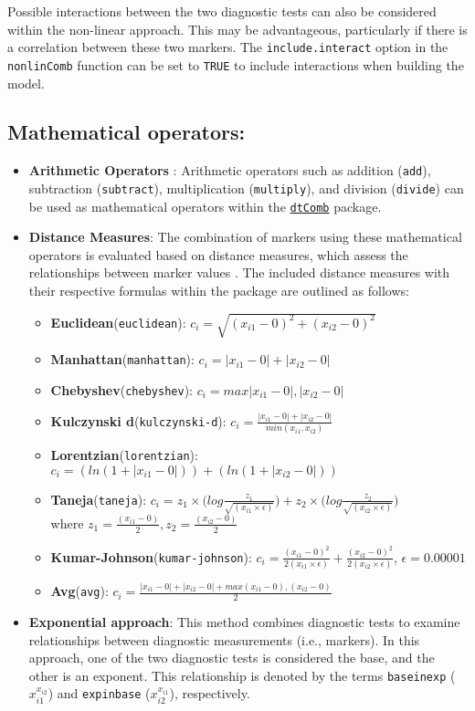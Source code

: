 \documentclass[10pt]{article}
\newcommand{\CRANpkg}[1]{\href{https://cran.r-project.org/web/packages/#1/index.html}{\texttt{#1}}}
\newcommand{\Rfunction}[1]{\texttt{#1}}
\begin{document}
Possible interactions between the two diagnostic tests can also be considered within the non-linear approach. This may be advantageous, particularly if there is a correlation between these two markers.  The \texttt{include.interact} option in the \Rfunction{nonlinComb} function can be set to \texttt{TRUE} to include interactions when building the model.
\subsection{Mathematical operators:}
\begin{itemize}
  \item \textbf{Arithmetic Operators} : Arithmetic operators such as addition (\texttt{add}), subtraction (\texttt{subtract}), multiplication (\texttt{multiply}), and division (\texttt{divide}) can be used as mathematical operators within the \CRANpkg{dtComb} package.
  \item \textbf{Distance Measures}: The combination of markers using these mathematical operators is evaluated based on distance measures, which assess the relationships between marker values \citep{cha2007comprehensive,pandit2011comparative, minaev2018distance}. The included distance measures with their respective formulas within the package are outlined as follows:
    \begin{itemize}
      \item \textbf{Euclidean}(\texttt{euclidean}): $c_i= { \sqrt{(x_{i1}-0)^2+(x_{i2}-0)^2}}$
      \item \textbf{Manhattan}(\texttt{manhattan}): $c_i = |x_{i1}-0|+|x_{i2}-0|$
      \item \textbf{Chebyshev}(\texttt{chebyshev}): $c_i = max{|x_{i1}-0|,|x_{i2}-0|}$
      \item \textbf{Kulczynski d}(\texttt{kulczynski-d}): $c_i = \frac{|x_{i1}-0|+|x_{i2}-0|}{min(x_{i1},x_{i2})}$ 
      \item \textbf{Lorentzian}(\texttt{lorentzian}): $c_i = (ln(1+|x_{i1}-0|))+ (ln(1+|x_{i2}-0|))$
      \item \textbf{Taneja}(\texttt{taneja}): $c_i = z_1\times\Biggl(log\frac{z_1}{\sqrt{(x_{i1}\times\epsilon )}}\Biggl)+z_2\times\Biggl(log\frac{z_2}{\sqrt{(x_{i2}\times\epsilon)}}\Biggl)$\\
      where $z_1 = \frac{(x_{i1}-0)}{2}, z_2 = \frac{(x_{i2}-0)}{2}$
            \item \textbf{Kumar-Johnson}(\texttt{kumar-johnson}): $c_i = {\frac{(x_{i1}-0)^2}{2(x_{i1}\times\epsilon)}}+{\frac{(x_{i2}-0)^2}{2(x_{i2}\times\epsilon)}}$, $\epsilon = 0.00001$
            \item \textbf{Avg}(\texttt{avg}): $c_i = \frac{|x_{i1}-0|+|x_{i2}-0| + max{(x_{i1}-0),(x_{i2}-0)}}{2}$
    \end{itemize}
  \item \textbf{Exponential approach}: This method combines diagnostic tests to examine relationships between diagnostic measurements (i.e., markers). In this approach, one of the two diagnostic tests is considered the base, and the other is an exponent. This relationship is denoted by the terms \texttt{baseinexp} ($x_{i1}^{x_{i2}}$) and \texttt{expinbase} ($x_{i2}^{x_{i1}}$), respectively.
\end{itemize}
\end{document}
